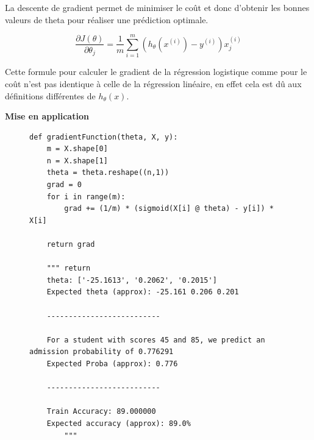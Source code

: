 La descente de gradient permet de minimiser le coût et donc d'obtenir les bonnes valeurs de theta pour réaliser une prédiction optimale.

\begin{equation}\label{eq:descente-gradient}
    \frac{\partial J(\theta)}{\partial \theta_j} = \frac{1}{m} \sum_{i=1}^{m} (h_\theta(x^{(i)}) - y^{(i)}) x_j^{(i)}
\end{equation}

\noindent
Cette formule pour calculer le gradient de la régression logistique comme pour le coût n'est pas identique à celle de la régression linéaire, en effet cela est dû aux définitions différentes de \( h_\theta (x) \).

\vspace{.5cm}
    \noindent
    \textbf{Mise en application}
    \vspace{.2cm}

\begin{figure}[!h]
\begin{verbatim}
def gradientFunction(theta, X, y):
    m = X.shape[0]  
    n = X.shape[1]   
    theta = theta.reshape((n,1)) 
    grad = 0
    for i in range(m):
        grad += (1/m) * (sigmoid(X[i] @ theta) - y[i]) * X[i]

    return grad

    """ return 
    theta: ['-25.1613', '0.2062', '0.2015']
    Expected theta (approx): -25.161 0.206 0.201
    
    -------------------------- 
    
    For a student with scores 45 and 85, we predict an admission probability of 0.776291
    Expected Proba (approx): 0.776
    
    -------------------------- 
    
    Train Accuracy: 89.000000
    Expected accuracy (approx): 89.0%
        """
\end{verbatim}   
\end{figure}


